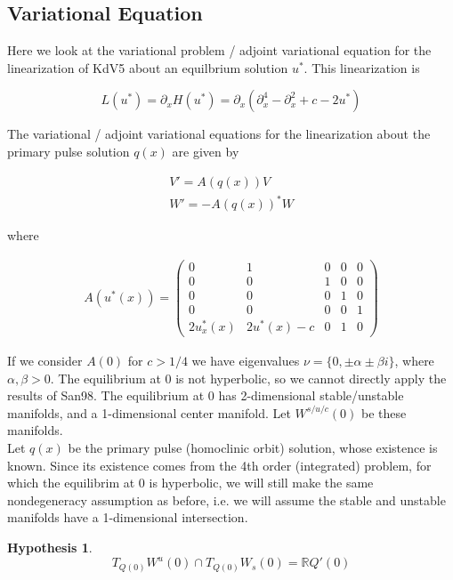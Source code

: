 \documentclass[12pt]{article}
\def\R{{\mathbb R}}
\newtheorem{hypothesis}{Hypothesis}
\begin{document}
\subsection*{Variational Equation}

Here we look at the variational problem / adjoint variational equation for the linearization of KdV5 about an equilbrium solution $u^*$. This linearization is

\begin{equation}
L(u^*) = \partial_x H(u^*) = \partial_x ( \partial_x^4 - \partial_x^2 + c - 2 u^*)
\end{equation}

The variational / adjoint variational equations for the linearization about the primary pulse solution $q(x)$ are given by

\begin{align}
V' = A(q(x))V \label{vareq} \\
W' = -A(q(x))^*W \label{adjvareq}
\end{align}

where

\begin{align}
A(u^*(x)) = \begin{pmatrix}0 & 1 & 0 & 0 & 0 \\ 0 & 0 & 1 & 0 & 0 \\ 0 & 0 & 0 & 1 & 0 \\ 0 & 0 & 0 & 0 & 1 \\
2u^*_x(x) & 2u^*(x) - c & 0 & 1 & 0 \end{pmatrix}
\end{align}

If we consider $A(0)$ for $c > 1/4$ we have eigenvalues $\nu = \{ 0, \pm \alpha \pm \beta i\}$, where $\alpha, \beta > 0$. The equilibrium at 0 is not hyperbolic, so we cannot directly apply the results of San98. The equilibrium at 0 has 2-dimensional stable/unstable manifolds, and a 1-dimensional center manifold. Let $W^{s/u/c}(0)$ be these manifolds.\\

Let $q(x)$ be the primary pulse (homoclinic orbit) solution, whose existence is known. Since its existence comes from the 4th order (integrated) problem, for which the equilibrim at 0 is hyperbolic, we will still make the same nondegeneracy assumption as before, i.e. we will assume the stable and unstable manifolds have a 1-dimensional intersection.

\begin{hypothesis}\label{nondegen}
\[
T_{Q(0)} W^u(0) \cap T_{Q(0)} W_s(0) = \R Q'(0)
\]
\end{hypothesis}
\end{document}
